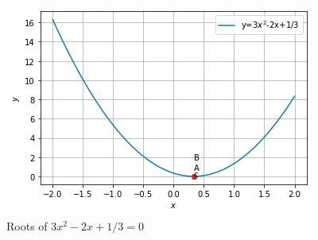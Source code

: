 \begin{figure}[!ht]
\centering
\includegraphics[width=\columnwidth]{solutions/su2021/2/25/download (3).png}
\caption{Roots of $3x^2 -2x + 1/3 = 0$ }
\label{quadforms/2/25/Roots of}
\end{figure}




